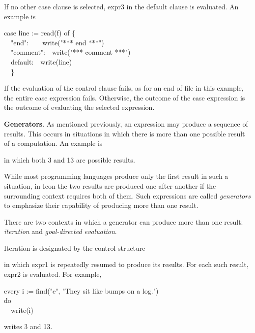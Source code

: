 
If no other case clause is selected, expr3 in the default clause is
evaluated. An example is

\begin{iconcode}
\>case line := read(f) of \{\\
\>\ \ "end":\ \ \ \ write("*** end ***")\\
\>\ \ "comment":\ \ write("*** comment ***")\\
\>\ \ default:\ \ write(line)\\
\>\ \ \}
\end{iconcode}

If the evaluation of the control clause fails, as for an end of file
in this example, the entire case expression fails.  Otherwise, the
outcome of the case expression is the outcome of evaluating the
selected expression.


\textbf{Generators}. As mentioned previously, an expression may
produce a sequence of results. This occurs in situations in which
there is more than one possible result of a computation. An example is


\noindent in which both 3 and 13 are possible results.

While most programming languages produce only the first result in such
a situation, in Icon the two results are produced one after another if
the surrounding context requires both of them. Such expressions are
called \textit{generators} to emphasize their capability of producing
more than one result.

There are two contexts in which a generator can produce more than one
result: \textit{iteration} and \textit{goal-directed evaluation}.

Iteration is designated by the control structure


\noindent in which expr1 is repeatedly resumed to produce its
results. For each such result, expr2 is evaluated. For example,

\begin{iconcode}
\>every i := find("e", "They sit like bumps on a log.")\\
\>do\\
\>\ \ write(i)
\end{iconcode}

\noindent writes 3 and 13.

